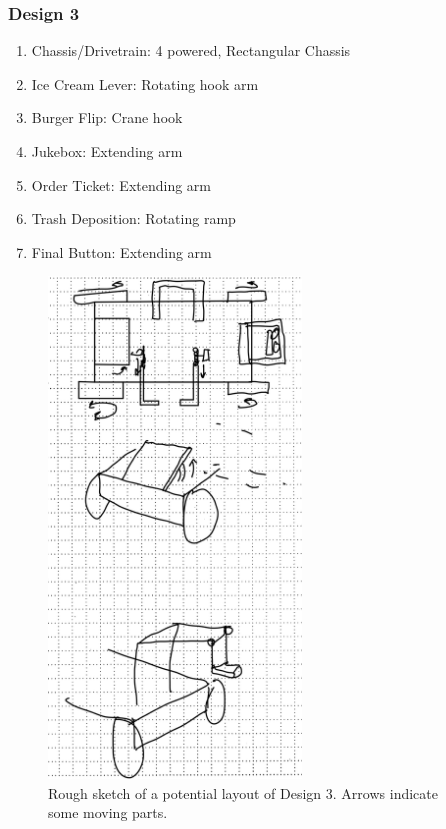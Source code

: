 \documentclass[12pt]{extarticle}
\begin{document}
\subsubsection*{Design 3}
\begin{enumerate}
    \item Chassis/Drivetrain: 4 powered, Rectangular Chassis
    \item Ice Cream Lever: Rotating hook arm
    \item Burger Flip: Crane hook
    \item Jukebox: Extending arm
    \item Order Ticket: Extending arm
    \item Trash Deposition: Rotating ramp
    \item Final Button: Extending arm
\end{enumerate}
\begin{figure}[H]
    \centering
    \includegraphics[width=0.6\textwidth]{fullpower.png}
    \caption{\centering Rough sketch of a potential layout of Design 3. Arrows indicate some moving parts.}
    \label{fig:fullpower}
\end{figure}
\end{document}
